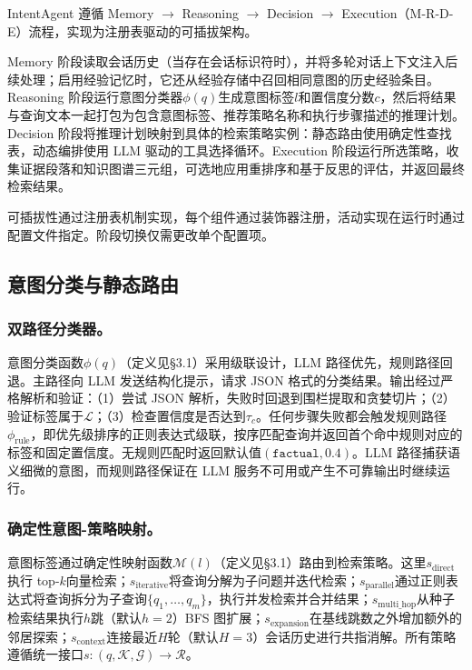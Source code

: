 \documentclass[runningheads]{llncs}
\begin{document}
IntentAgent 遵循 Memory $\to$ Reasoning $\to$ Decision $\to$ Execution（M-R-D-E）流程，实现为注册表驱动的可插拔架构。

Memory 阶段读取会话历史（当存在会话标识符时），并将多轮对话上下文注入后续处理；启用经验记忆时，它还从经验存储中召回相同意图的历史经验条目。Reasoning 阶段运行意图分类器$\phi(q)$生成意图标签$l$和置信度分数$c$，然后将结果与查询文本一起打包为包含意图标签、推荐策略名称和执行步骤描述的推理计划。Decision 阶段将推理计划映射到具体的检索策略实例：静态路由使用确定性查找表，动态编排使用 LLM 驱动的工具选择循环。Execution 阶段运行所选策略，收集证据段落和知识图谱三元组，可选地应用重排序和基于反思的评估，并返回最终检索结果。

可插拔性通过注册表机制实现，每个组件通过装饰器注册，活动实现在运行时通过配置文件指定。阶段切换仅需更改单个配置项。

\subsection{意图分类与静态路由}

\subsubsection{双路径分类器。}

意图分类函数$\phi(q)$（定义见§3.1）采用级联设计，LLM 路径优先，规则路径回退。主路径向 LLM 发送结构化提示，请求 JSON 格式的分类结果。输出经过严格解析和验证：（1）尝试 JSON 解析，失败时回退到围栏提取和贪婪切片；（2）验证标签属于$\mathcal{L}$；（3）检查置信度是否达到$\tau_c$。任何步骤失败都会触发规则路径$\phi_{\text{rule}}$，即优先级排序的正则表达式级联，按序匹配查询并返回首个命中规则对应的标签和固定置信度。无规则匹配时返回默认值$(\texttt{factual}, 0.4)$。LLM 路径捕获语义细微的意图，而规则路径保证在 LLM 服务不可用或产生不可靠输出时继续运行。

\subsubsection{确定性意图-策略映射。}

意图标签通过确定性映射函数$\mathcal{M}(l)$（定义见§3.1）路由到检索策略。这里$s_{\text{direct}}$执行 top-$k$向量检索；$s_{\text{iterative}}$将查询分解为子问题并迭代检索；$s_{\text{parallel}}$通过正则表达式将查询拆分为子查询$\{q_1, \ldots, q_m\}$，执行并发检索并合并结果；$s_{\text{multi\_hop}}$从种子检索结果执行$h$跳（默认$h=2$）BFS 图扩展；$s_{\text{expansion}}$在基线跳数之外增加额外的邻居探索；$s_{\text{context}}$连接最近$H$轮（默认$H=3$）会话历史进行共指消解。所有策略遵循统一接口$s: (q, \mathcal{K}, \mathcal{G}) \to \mathcal{R}$。
\end{document}

